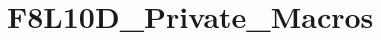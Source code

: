 \hypertarget{group___f8_l10_d___private___macros}{}\section{F8\+L10\+D\+\_\+\+Private\+\_\+\+Macros}
\label{group___f8_l10_d___private___macros}
